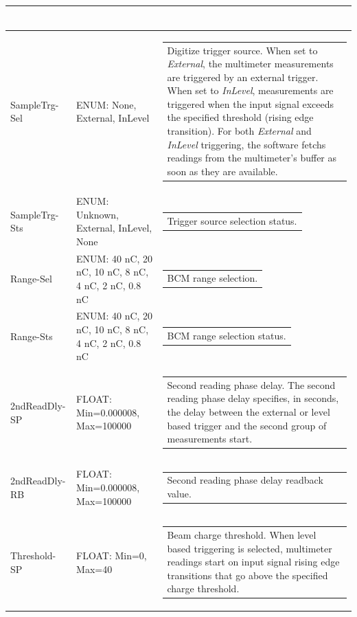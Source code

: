 \documentclass[openany]{article}
\begin{document}
\begin{longtable}{| m{3.0cm} m{4.5cm} m{7.0cm} |}
\begin{tabular}{@{}m{6cm}@{}}
						\end{tabular} \\ \hline
		SampleTrg-Sel & ENUM: None, External, InLevel & \begin{tabular}{@{}m{6cm}@{}}
				      	  Digitize trigger source. When set to \emph{External}, the multimeter measurements are triggered by an external trigger. When set to \emph{InLevel}, measurements are triggered when the input signal exceeds the specified threshold (rising edge transition). For both \emph{External} and \emph{InLevel} triggering, the software fetchs $ 2 \times count $ readings from the multimeter's buffer as soon as they are available.
					  \end{tabular} \\ \hline
		SampleTrg-Sts & ENUM: Unknown, External, InLevel, None & \begin{tabular}{@{}m{6cm}@{}}
	    					Trigger source selection status.
						\end{tabular} \\ \hline
		Range-Sel & ENUM: 40 nC, 20 nC, 10 nC, 8 nC, 4 nC, 2 nC, 0.8 nC & \begin{tabular}{@{}m{6cm}@{}}
	    					BCM range selection.
						\end{tabular} \\ \hline
		Range-Sts & ENUM: 40 nC, 20 nC, 10 nC, 8 nC, 4 nC, 2 nC, 0.8 nC & \begin{tabular}{@{}m{6cm}@{}}
	    					BCM range selection status.
						\end{tabular} \\ \hline
		2ndReadDly-SP & FLOAT: Min=0.000008, Max=100000 & \begin{tabular}{@{}m{6cm}@{}}
	    					Second reading phase delay. The second reading phase delay specifies, in seconds, the delay between the external or level based trigger and the second group of measurements start.
						\end{tabular} \\ \hline
		2ndReadDly-RB & FLOAT: Min=0.000008, Max=100000 & \begin{tabular}{@{}m{6cm}@{}}
	    					Second reading phase delay readback value.
						\end{tabular} \\ \hline
		Threshold-SP & FLOAT: Min=0, Max=40 & \begin{tabular}{@{}m{6cm}@{}}
	    					Beam charge threshold. When level based triggering is selected, multimeter readings start on input signal rising edge transitions that go above the specified charge threshold.

\end{tabular}
\end{longtable}
\end{document}

